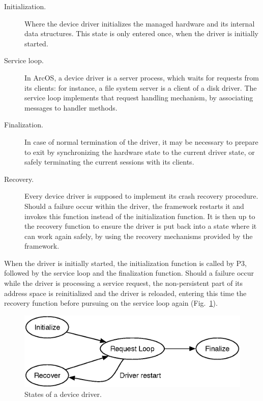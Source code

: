 \documentclass{report}
\begin{document}
\begin{description}
\item[Initialization.]
Where the device driver initializes the managed hardware and its internal data structures. This state is only entered once, when the driver is initially started.

\item[Service loop.]
In ArcOS, a device driver is a server process, which waits for requests from its clients: for instance, a file system server is a client of a disk driver. The service loop implements that request handling mechanism, by associating messages to handler methods.

\item[Finalization.]
In case of normal termination of the driver, it may be necessary to prepare to exit by synchronizing the hardware state to the current driver state, or safely terminating the current sessions with its clients.

\item[Recovery.]
Every device driver is supposed to implement its crash recovery procedure. Should a failure occur within the driver, the framework restarts it and invokes this function instead of the initialization function. It is then up to the recovery function to ensure the driver is put back into a state where it can work again safely, by using the recovery mechanisms provided by the framework.
\end{description}

When the driver is initially started, the initialization function is called by P3, followed by the service loop and the finalization function. Should a failure occur while the driver is processing a service request, the non-persistent part of its address space is reinitialized and the driver is reloaded, entering this time the recovery function before pursuing on the service loop again (Fig.~\ref{fig:driverstatemachine}).

\begin{figure}[ht]
\centering
\includegraphics[scale=0.6]{driverstatemachine}
\caption{States of a device driver.}
\label{fig:driverstatemachine}
\end{figure}
\end{document}

